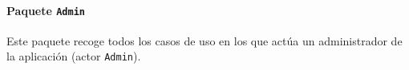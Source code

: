 \paragraph{Paquete \texttt{Admin}}

Este paquete recoge todos los casos de uso en los que actúa un administrador de la aplicación (actor \texttt{Admin}).

